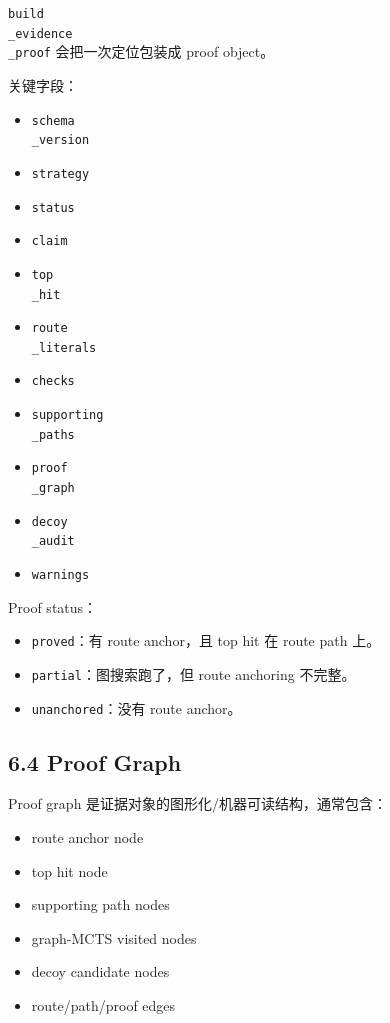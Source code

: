 \documentclass[UTF8,12pt,openany]{ctexbook}
\begin{document}
\texttt{build\\_evidence\\_proof} 会把一次定位包装成 proof object。\par

关键字段：\par

\begin{itemize}
\item \texttt{schema\\_version}
\item \texttt{strategy}
\item \texttt{status}
\item \texttt{claim}
\item \texttt{top\\_hit}
\item \texttt{route\\_literals}
\item \texttt{checks}
\item \texttt{supporting\\_paths}
\item \texttt{proof\\_graph}
\item \texttt{decoy\\_audit}
\item \texttt{warnings}
\end{itemize}

Proof status：\par

\begin{itemize}
\item \texttt{proved}：有 route anchor，且 top hit 在 route path 上。
\item \texttt{partial}：图搜索跑了，但 route anchoring 不完整。
\item \texttt{unanchored}：没有 route anchor。
\end{itemize}

\subsection{6.4 Proof Graph}

Proof graph 是证据对象的图形化/机器可读结构，通常包含：\par

\begin{itemize}
\item route anchor node
\item top hit node
\item supporting path nodes
\item graph-MCTS visited nodes
\item decoy candidate nodes
\item route/path/proof edges
\end{itemize}
\end{document}
